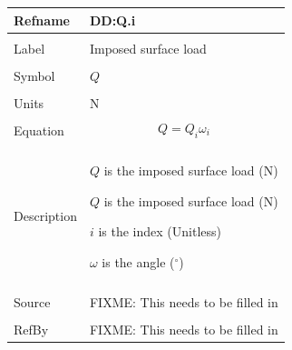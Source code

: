 \documentclass[12pt]{article}
\begin{document}
\noindent \begin{minipage}{\textwidth}
\begin{tabular}{p{} p{}}
\toprule \textbf{Refname} & \textbf{DD:Q.i}
\label{DD:Q.i}
\\ \midrule \\
Label & Imposed surface load
\\ \midrule \\
Symbol & $Q$
\\ \midrule \\
Units & N
\\ \midrule \\
Equation & \begin{dmath}
           Q=Q_{i} ω_{i}
           \end{dmath}
\\ \midrule \\
Description & \begin{symbDescription}
              \item{$Q$ is the imposed surface load (N)}
              \item{$Q$ is the imposed surface load (N)}
              \item{$i$ is the index (Unitless)}
              \item{$ω$ is the angle (${}^{\circ}$)}
              \end{symbDescription}
\\ \midrule \\
Source & FIXME: This needs to be filled in
\\ \midrule \\
RefBy & FIXME: This needs to be filled in
\\ \bottomrule \end{tabular}
\end{minipage}\\
~\newline
\end{document}
